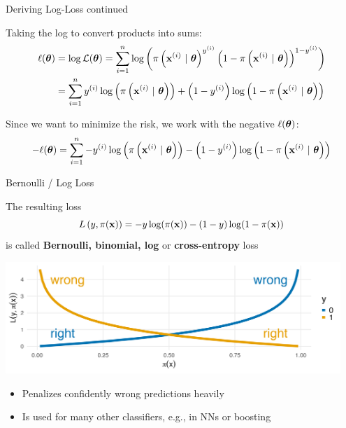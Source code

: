 \documentclass[11pt,compress,t,notes=noshow, xcolor=table]{beamer}
\begin{document}
\begin{vbframe}{Deriving Log-Loss continued}

Taking the log to convert products into sums:
\begin{align*}
\ell(\bm{\theta}) &= \log \mathcal{L}(\bm{\theta}) = 
\sum\limits_{i=1}^n \log\left(\pi\left(\mathbf{x}^{(i)} ~|~ \bm{\theta}\right)^{y^{(i)}} \left(1-\pi\left(\mathbf{x}^{(i)} ~|~ \bm{\theta}\right)\right)^{1-y^{(i)}}\right) \\
       &= \sum\limits_{i=1}^n y^{(i)} \log\left(\pi\left(\mathbf{x}^{(i)} ~|~ \bm{\theta}\right)\right) + \left(1-y^{(i)}\right)\log\left(1-\pi\left(\mathbf{x}^{(i)} ~|~ \bm{\theta}\right)\right)
\end{align*}

Since we want to minimize the risk, we work with the negative $\ell(\bm{\theta})$:
$$
- \ell(\bm{\theta}) = \sum\limits_{i=1}^n - y^{(i)} \log\left(\pi\left(\mathbf{x}^{(i)} ~|~ \bm{\theta}\right)\right) - \left(1-y^{(i)}\right)\log\left(1-\pi\left(\mathbf{x}^{(i)} ~|~ \bm{\theta}\right)\right)
$$


\end{vbframe}

\begin{vbframe}{Bernoulli / Log Loss}

The resulting loss 
$$L\left(y, \pi(\mathbf{x})\right) = -y\log(\pi(\mathbf{x}))-(1-y)\log(1-\pi(\mathbf{x}))$$ 
is called \textbf{Bernoulli, binomial, log} or \textbf{cross-entropy} loss

\lz

{\centering \includegraphics[width=0.95\textwidth]{figure/log_loss.png}
}

\lz

\begin{itemize}
  \item Penalizes confidently wrong predictions heavily
  \item Is used for many other classifiers, e.g., in NNs or boosting 


  
\end{itemize}


\end{vbframe}
\end{document}
